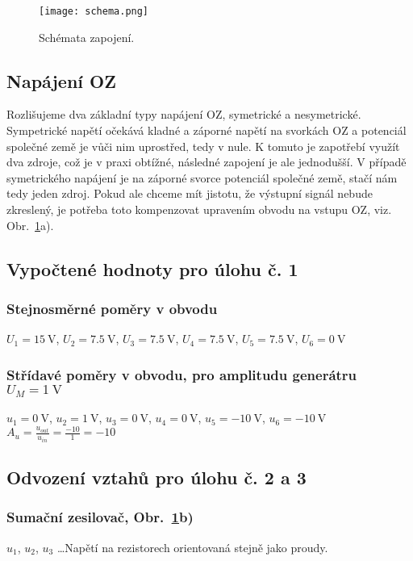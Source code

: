 \begin{figure}[h!]
    \centering
    \texttt{[image: schema.png]}
    \centering
    \caption{Schémata zapojení.}
    \label{fig:schema}
\end{figure}

\subsection{Napájení OZ}

    Rozlišujeme dva základní typy napájení OZ, symetrické a nesymetrické. Sympetrické napětí očekává kladné a záporné napětí na svorkách OZ a potenciál společné země je vůči nim uprostřed, tedy v nule. K tomuto je zapotřebí využít dva zdroje, což je v praxi obtížné, následné zapojení je ale jednodušší. V případě symetrického napájení je na záporné svorce potenciál společné země, stačí nám tedy jeden zdroj. Pokud ale chceme mít jistotu, že výstupní signál nebude zkreslený, je potřeba toto kompenzovat upravením obvodu na vstupu OZ, viz. Obr.~\ref{fig:schema}a).


\subsection{Vypočtené hodnoty pro úlohu č. 1}
    \subsubsection{Stejnosměrné poměry v obvodu}
        $ U_1=\qty{15}{\volt} $, $ U_2=\qty{7.5}{\volt} $, $ U_3=\qty{7.5}{\volt} $, $ U_4=\qty{7.5}{\volt} $, $ U_5=\qty{7.5}{\volt} $, $ U_6=\qty{0}{\volt} $

    \subsubsection{Střídavé poměry v obvodu, pro amplitudu generátru $ U_M=\qty{1}{\volt} $ }
        $ u_1=\qty{0}{\volt} $, 
        $ u_2=\qty{1}{\volt} $, 
        $ u_3=\qty{0}{\volt} $, 
        $ u_4=\qty{0}{\volt} $, 
        $ u_5=\qty{-10}{\volt} $, 
        $ u_6=\qty{-10}{\volt} $\\
        $ A_u=\frac{u_{out}}{u_{in}}=\frac{-10}{1}=-10 $

\subsection{Odvození vztahů pro úlohu č. 2 a 3}
    \subsubsection{Sumační zesilovač, Obr.~\ref{fig:schema}b)}
        $ u_1 $, $ u_2 $, $ u_3 $ \dots Napětí na rezistorech orientovaná stejně jako proudy. 

